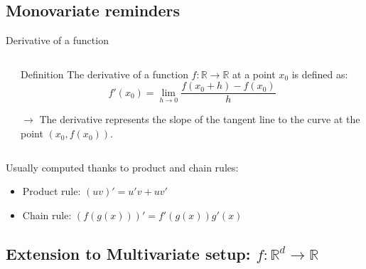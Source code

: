 \documentclass[aspectratio=1610]{beamer}
\begin{document}
\subsection{Monovariate reminders}

\begin{frame}{Derivative of a function}

  \begin{columns}
    \begin{column}{0.45\textwidth}
    \end{column}
    \begin{column}{0.45\textwidth}
      \begin{block}{Definition}
        The derivative of a function $f:\mathbb{R}\to\mathbb{R}$ at a point $x_0$ is defined as:
        $$f'(x_0) = \lim_{h\to 0} \frac{f(x_0 + h) - f(x_0)}{h}$$
      \end{block}
      $\rightarrow$ The derivative represents the slope of the tangent line to the curve at the point $(x_0, f(x_0))$.
    \end{column}
  \end{columns}

  Usually computed thanks to product and chain rules:
  \begin{itemize}
    \item Product rule: $(uv)' = u'v + uv'$
    \item Chain rule: $(f(g(x)))' = f'(g(x))g'(x)$
  \end{itemize}
\end{frame}

\subsection{Extension to Multivariate setup: $f:\mathbb{R}^d \to \mathbb{R}$}
\end{document}

